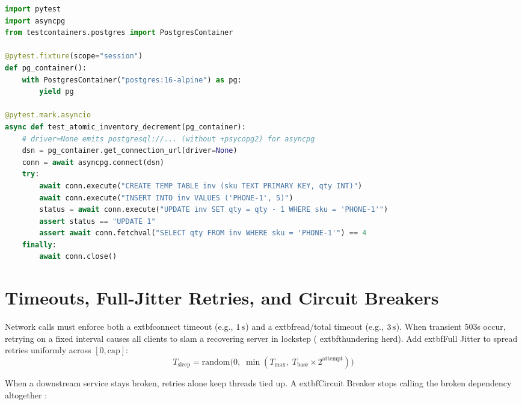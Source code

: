 \begin{lstlisting}[language=Python,caption={Testcontainers + 	exttt{asyncpg} Integration Test with 	exttt{driver=None}}]
import pytest
import asyncpg
from testcontainers.postgres import PostgresContainer

@pytest.fixture(scope="session")
def pg_container():
    with PostgresContainer("postgres:16-alpine") as pg:
        yield pg

@pytest.mark.asyncio
async def test_atomic_inventory_decrement(pg_container):
    # driver=None emits postgresql://... (without +psycopg2) for asyncpg
    dsn = pg_container.get_connection_url(driver=None)
    conn = await asyncpg.connect(dsn)
    try:
        await conn.execute("CREATE TEMP TABLE inv (sku TEXT PRIMARY KEY, qty INT)")
        await conn.execute("INSERT INTO inv VALUES ('PHONE-1', 5)")
        status = await conn.execute("UPDATE inv SET qty = qty - 1 WHERE sku = 'PHONE-1'")
        assert status == "UPDATE 1"
        assert await conn.fetchval("SELECT qty FROM inv WHERE sku = 'PHONE-1'") == 4
    finally:
        await conn.close()
\end{lstlisting}

\section{Timeouts, Full-Jitter Retries, and Circuit Breakers}

Network calls must enforce both a 	extbf{connect timeout} (e.g., $1\text{\,s}$) and a 	extbf{read/total timeout} (e.g., $3\text{\,s}$). When transient 503s occur, retrying on a fixed interval causes all clients to slam a recovering server in lockstep (	extbf{thundering herd}). Add 	extbf{Full Jitter} to spread retries uniformly across $[0, \text{cap}]$:
$$T_{\text{sleep}} = \text{random}\big(0, \; \min(T_{\text{max}}, \; T_{\text{base}} \times 2^{\text{attempt}})\big)$$

When a downstream service stays broken, retries alone keep threads tied up. A 	extbf{Circuit Breaker} stops calling the broken dependency altogether \cite{beyer2016site}:

